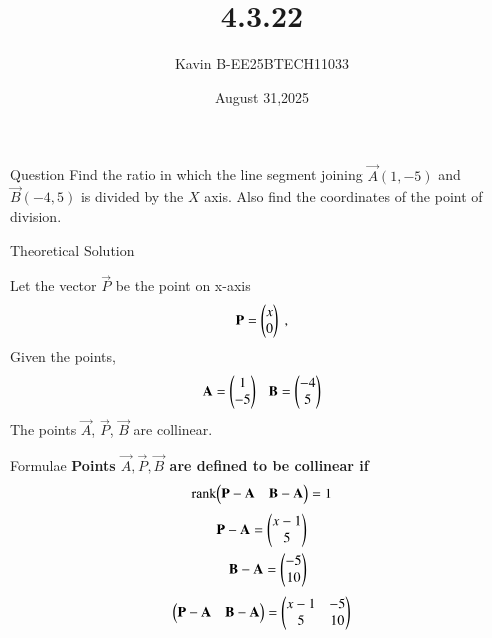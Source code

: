 \documentclass{beamer}
\begin{document}
\title 
{4.3.22}
\date{August 31,2025}


\author 
{Kavin B-EE25BTECH11033}






\frame{\titlepage}
\begin{frame}{Question}
Find the ratio in which the line segment joining $\vec{A}(1,-5)$  and  $\vec{B}(-4,5)$ is divided by the $X$ axis. Also find the coordinates of the point of division.\\
\end{frame}



\begin{frame}{Theoretical Solution}

Let the vector $\vec{P}$ be the point on x-axis
\begin{align}
    \vec{P}=\begin{myvec}{x\\0}\end{myvec} \;, 
\end{align}
Given the points,
\begin{align}
    \vec{A}=\begin{myvec}{1\\-5}\end{myvec}\ \ \ 
    \vec{B}=\begin{myvec}{-4\\5}\end{myvec}
\end{align}
\bigskip
The points $\vec{A}$, $\vec{P}$, $\vec{B}$ are collinear.\\

\end{frame}

\begin{frame}{Formulae}
\textbf{Points $\vec{A}, \vec{P}, \vec{B}$ are defined to be collinear if}
\begin{align}
		\label{eq:line-rank-2}
		\text{rank}{\ensuremath{\begin{pmatrix}\mathbf{P}-\mathbf{A}& \mathbf{B}-\mathbf{A}\end{pmatrix}}} = 1
\end{align}
\begin{align}
            \mathbf{P}-\mathbf{A} = \begin{pmatrix}x-1\\5\end{pmatrix}\\
            \mathbf{B}-\mathbf{A} = \begin{pmatrix}-5\\10\end{pmatrix}
\end{align}    
\begin{align}
            \begin{pmatrix}\mathbf{P}-\mathbf{A}& \mathbf{B}-\mathbf{A}\end{pmatrix} = \begin{pmatrix}x-1 & -5\\5 & 10\end{pmatrix}
		\end{align}
\end{frame}
\end{document}
